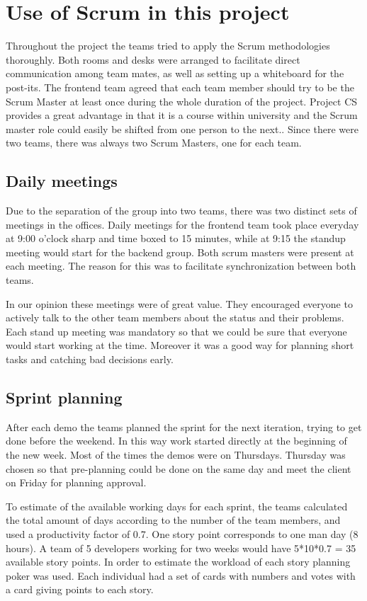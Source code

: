 \section{Use of Scrum in this project}
Throughout the project the teams tried to apply the Scrum methodologies thoroughly.
Both rooms and desks were arranged to facilitate direct communication among team mates, as well as setting up a whiteboard for the post-its. 
The frontend team agreed that each team member should try to
be the Scrum Master at least once during the whole duration of the project.
Project CS provides a great advantage in that it is a course within university and the Scrum master role could easily be shifted from one person to the next..
Since there were two teams, there was always two Scrum Masters, one for each team.

\subsection{Daily meetings}
Due to the separation of the group into two teams, there was two distinct sets of meetings in the offices.
Daily meetings for the frontend team took place everyday at 9:00 o'clock sharp and time boxed to 15 minutes,
while at 9:15 the standup meeting would start for the backend group.
Both scrum masters were present at each meeting.
The reason for this was to facilitate synchronization between both teams.

In our opinion these meetings were of great value. 
They encouraged everyone to actively talk to the other team members about
the status and their problems.
Each stand up meeting was mandatory so that we could be sure
that everyone would start working at the time. 
Moreover it was a good way for planning short tasks and catching bad decisions early.

\subsection{Sprint planning}
After each demo the teams planned the sprint for the next iteration, trying to get done before the weekend.
In this way work started directly at the beginning of the new week. Most of the times the demos were on Thursdays. Thursday was chosen so that pre-planning could be done on the same day and meet the client on Friday for planning approval.

To estimate of the available working days for each sprint, the teams calculated the total amount of days
according to the number of the team members, and used a productivity factor of 0.7. One story point corresponds to one man day (8 hours). A team of 5 developers working
for two weeks would have 5*10*0.7 = 35 available story points.
In order to estimate the workload of each story planning poker was used. Each individual had a set of cards
with numbers and votes with a card giving points to each story. 

